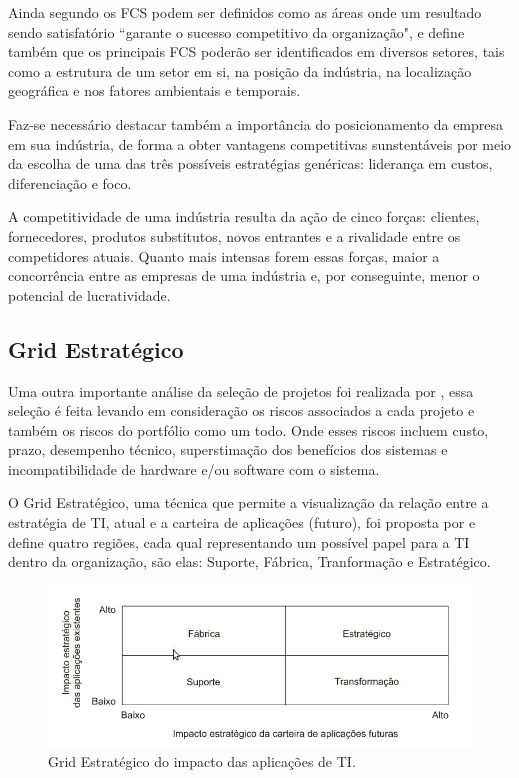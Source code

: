 \documentclass[12pt,a4paper,ruledheader,tocpage=prefix,floatnumber=continuous,pagestart=folhaderosto,font=times]{abnt}
\begin{document}
Ainda segundo\cite{rockart} os FCS podem ser definidos como as áreas onde um resultado sendo satisfatório ``garante o sucesso competitivo da organização",
e define também que os principais FCS poderão ser identificados em diversos setores, tais como a estrutura de um setor em si, na posição da indústria, 
na localização geográfica e nos fatores ambientais e temporais.

Faz-se necessário destacar também a importância do posicionamento da empresa em sua indústria, de forma a obter vantagens competitivas sunstentáveis por 
meio da escolha de uma das três possíveis estratégias genéricas: liderança em custos, diferenciação e foco.  

A competitividade de uma indústria resulta da ação de cinco forças: clientes, fornecedores, produtos substitutos, novos entrantes e a rivalidade entre 
os competidores atuais. Quanto mais intensas forem essas forças, maior a concorrência entre as empresas de uma indústria e, por conseguinte, menor o 
potencial de lucratividade.\cite{porter1, porter2} 

\subsection{Grid Estratégico}
Uma outra importante análise da seleção de projetos foi realizada por \cite{mcfarlan}, essa seleção é feita levando em consideração os riscos associados
a cada projeto e também os riscos do portfólio como um todo. Onde esses riscos incluem custo, prazo, desempenho técnico, superstimação dos benefícios 
dos sistemas e incompatibilidade de hardware e/ou software com o sistema. 

O Grid Estratégico, uma técnica que permite a visualização da relação entre a estratégia de TI, atual e a carteira de aplicações (futuro), foi proposta 
por \cite{mcfarlan} e define quatro regiões, cada qual representando um possível papel para a TI dentro da organização, são elas: Suporte, Fábrica, 
Tranformação e Estratégico.

\begin{figure}[H]
\centering
\includegraphics[width=.9\textwidth]{grid_estrategico.jpg}
\caption{Grid Estratégico do impacto das aplicações de TI\cite{mcfarlan}.}
\end{figure} 
\end{document}
